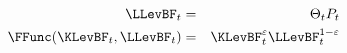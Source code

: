 \begin{eqnarray*}
    \LLevBF_{t} & = & \Theta_{t} {P}_{t}
\\   \FFunc(\KLevBF_{t},\LLevBF_{t}) & = & \KLevBF_{t}^{\varepsilon}\LLevBF_{t}^{1-\varepsilon} \label{eq:defLF}
\end{eqnarray*}

